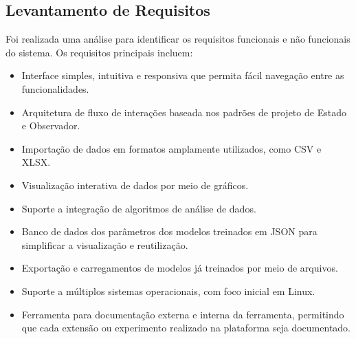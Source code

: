 \subsection{Levantamento de Requisitos}
\label{sec:2:requisitos}

Foi realizada uma análise para identificar os requisitos funcionais e não funcionais do sistema. Os requisitos principais incluem:

\begin{itemize}
    \item Interface simples, intuitiva e responsiva que permita fácil navegação entre as funcionalidades.
    \item Arquitetura de fluxo de interações baseada nos padrões de projeto de Estado e Observador.
    \item Importação de dados em formatos amplamente utilizados, como CSV e XLSX.
    \item Visualização interativa de dados por meio de gráficos.
    \item Suporte a integração de algoritmos de análise de dados.
    \item Banco de dados dos parâmetros dos modelos treinados em JSON para simplificar a visualização e reutilização.
    \item Exportação e carregamentos de modelos já treinados por meio de arquivos.
    \item Suporte a múltiplos sistemas operacionais, com foco inicial em Linux.
    \item Ferramenta para documentação externa e interna da ferramenta, permitindo que cada extensão ou experimento realizado na plataforma seja documentado.
\end{itemize}

